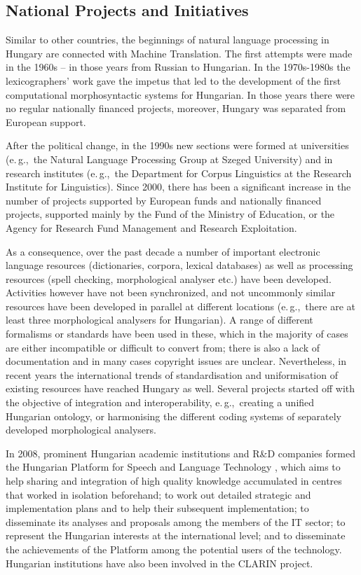 \begin{multicols}{2}
\subsection{National Projects and Initiatives}

Similar to other countries, the beginnings of natural language processing in Hungary are connected with Machine Translation. The first attempts were made in the 1960s -- in those years from Russian to Hungarian. In the 1970s-1980s the lexicographers' work gave the impetus that led to the development of the first computational morphosyntactic systems for Hungarian. In those years there were no regular nationally financed projects, moreover, Hungary was separated from European support.

    After the political change, in the 1990s new sections were formed at universities (e.\,g.,~the Natural Language Processing Group at Szeged University) and in research institutes (e.\,g.,~the Department for Corpus Linguistics at the Research Institute for Linguistics). Since 2000, there has been a significant increase in the number of projects supported by European funds and nationally financed projects, supported mainly by the Fund of the Ministry of Education, or the Agency for Research Fund Management and Research Exploitation. 

    As a consequence, over the past decade a number of important electronic language resources (dictionaries, corpora, lexical databases) as well as processing resources (spell checking, morphological analyser etc.) have been developed. Activities however have not been synchronized, and not uncommonly similar resources have been developed in parallel at different locations (e.\,g.,~there are at least three morphological analysers for Hungarian). A range of different formalisms or standards have been used in these, which in the majority of cases are either incompatible or difficult to convert from; there is also a lack of documentation and in many cases copyright issues are unclear. Nevertheless, in recent years the international trends of standardisation and uniformisation of existing resources have reached Hungary as well. Several projects started off with the objective of integration and interoperability, e.\,g.,~creating a unified Hungarian ontology, or harmonising the different coding systems of separately developed morphological analysers.

    In 2008, prominent Hungarian academic institutions and R\&D companies formed the Hungarian Platform for Speech and Language Technology \cite{platform}, which aims to help sharing and integration of high quality knowledge accumulated in centres that worked in isolation beforehand; to work out detailed strategic and implementation plans and to help their subsequent implementation; to disseminate its analyses and proposals among the members of the IT sector; to represent the Hungarian interests at the international level; and to disseminate the achievements of the Platform among the potential users of the technology. Hungarian institutions have also been involved in the CLARIN project. 


\end{multicols}
